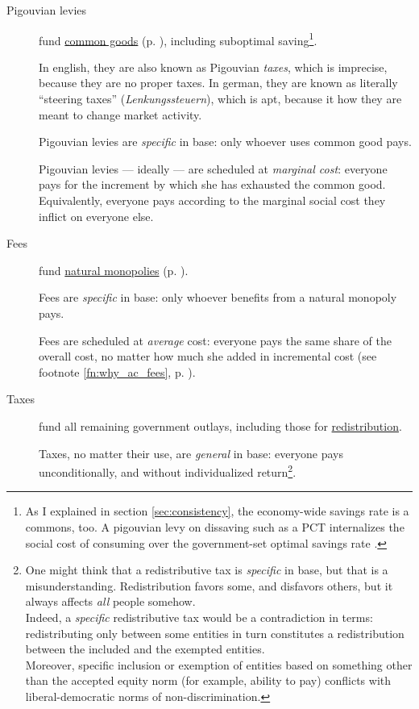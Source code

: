 \begin{description}
	\item[Pigouvian levies]  \label{sec:levies} fund \hyperref[sec:common_good]{common goods} (p. \pageref{sec:common_good}), including suboptimal saving\footnote{
		As I explained in section \ref{sec:consistency}, the economy-wide savings rate is a commons, too. A pigouvian levy on dissaving such as a \gls{PCT} internalizes the social cost of consuming over the government-set optimal savings rate \citep{Held2010a}.}. %

	In english, they are also known as Pigouvian \emph{taxes}, which is imprecise, because they are no proper taxes. In german, they are known as literally ``steering taxes'' (\emph{Lenkungssteuern}), which is apt, because it how they are meant to change market activity.

	Pigouvian levies are \emph{specific} in base: only whoever uses common good pays. 
	
	Pigouvian levies --- ideally --- are scheduled at \emph{marginal cost}: everyone pays for the increment by which she has exhausted the common good. Equivalently, everyone pays according to the marginal social cost they inflict on everyone else. 

	\item[Fees]  \label{sec:fees}
	fund \hyperref[sec:natural_monopoly]{natural monopolies} (p. \pageref{sec:natural_monopoly}). 
	
	Fees are \emph{specific} in base: only whoever benefits from a natural monopoly pays. 
	
	Fees are scheduled at \emph{average} cost: everyone pays the same share of the overall cost, no matter how much she added in incremental cost (see footnote \ref{fn:why_ac_fees}, p. \pageref{fn:why_ac_fees}). 

	\item[Taxes]  \label{sec:taxes} fund all remaining government outlays, including those for \hyperref[sec:redistributive_policy]{redistribution}.
	
	Taxes, no matter their use, are \emph{general} in base: everyone pays unconditionally, and without individualized return\footnote{
		One might think that a redistributive tax is \emph{specific} in base, but that is a misunderstanding. Redistribution favors some, and disfavors others, but it always affects \emph{all} people somehow.\\
		Indeed, a \emph{specific} redistributive tax would be a contradiction in terms: redistributing only between some entities in turn constitutes a redistribution between the included and the exempted entities.\\ Moreover, specific inclusion or exemption of entities based on something other than the accepted equity norm (for example, ability to pay) conflicts with liberal-democratic norms of non-discrimination.}.
	 

\end{description}
